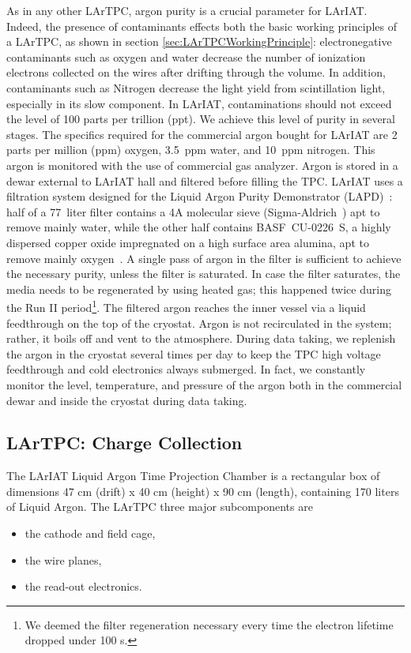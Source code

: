 As in any other LArTPC, argon purity is a crucial parameter for LArIAT. Indeed, the presence of contaminants effects both the basic working principles of a LArTPC, as shown in section \ref{sec:LArTPCWorkingPrinciple}: electronegative contaminants such as oxygen and water decrease the number of ionization electrons collected on the wires after drifting through the volume. In addition, contaminants such as Nitrogen decrease the light yield from scintillation light, especially in its slow component.
In LArIAT, contaminations should not exceed the level of 100 parts per trillion (ppt). We achieve this level of purity in several stages. The specifics required for the commercial argon bought for LArIAT are 2 parts per million (ppm) oxygen, 3.5~ppm water, and 10~ppm nitrogen. This argon is monitored with the use of commercial gas analyzer.
Argon is stored in a dewar external to LArIAT hall and filtered before filling the TPC. %
LArIAT uses a filtration system designed for the Liquid Argon Purity Demonstrator (LAPD)~\cite{LAPD}: half of a 77~liter filter contains a 4A molecular sieve (Sigma-Aldrich~\cite{sigma-aldrich}) apt to remove mainly water, while the other half contains BASF~CU-0226~S, a highly dispersed copper oxide impregnated on a high surface area alumina, apt to remove mainly oxygen~\cite{basf}. A single pass of argon in the filter is sufficient to achieve the necessary purity, unless the filter is saturated. In case the filter saturates, the media needs to be regenerated by using heated gas; this happened twice during the Run II period\footnote{We deemed the filter regeneration necessary every time the electron lifetime dropped under 100 \textmu s.}.
The filtered argon reaches the inner vessel via a liquid feedthrough on the top of the cryostat. Argon is not recirculated in the system; rather, it boils off and vent to the atmosphere. During data taking, we replenish the argon in the cryostat several times per day to keep the TPC high voltage feedthrough and cold electronics always submerged. In fact, we constantly monitor the level, temperature, and pressure of the argon both in the commercial dewar and inside the cryostat during data taking. 
\subsection{LArTPC: Charge Collection}\label{sec:TPCCharge}
The LArIAT Liquid Argon Time Projection Chamber is a rectangular box of dimensions 47 cm (drift) x 40 cm (height) x 90 cm (length), containing 170 liters of Liquid Argon.
The LArTPC three major subcomponents are 
\begin{itemize} 
\item[1)] the cathode and field cage,
\item [2)] the wire planes, 
\item [3)] the read-out electronics. %
\end{itemize}



